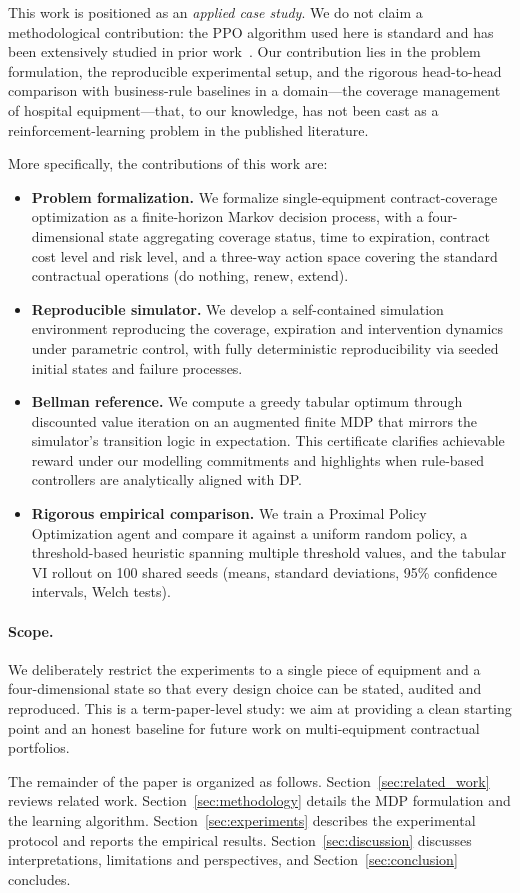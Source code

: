 This work is positioned as an \emph{applied case study}. We do not claim a methodological contribution: the PPO algorithm used here is standard and has been extensively studied in prior work~\cite{schulman2017ppo, andrychowicz2021matters}. Our contribution lies in the problem formulation, the reproducible experimental setup, and the rigorous head-to-head comparison with business-rule baselines in a domain---the coverage management of hospital equipment---that, to our knowledge, has not been cast as a reinforcement-learning problem in the published literature.

More specifically, the contributions of this work are:
\begin{itemize}
    \item \textbf{Problem formalization.} We formalize single-equipment contract-coverage optimization as a finite-horizon Markov decision process, with a four-dimensional state aggregating coverage status, time to expiration, contract cost level and risk level, and a three-way action space covering the standard contractual operations (do nothing, renew, extend).
    \item \textbf{Reproducible simulator.} We develop a self-contained simulation environment reproducing the coverage, expiration and intervention dynamics under parametric control, with fully deterministic reproducibility via seeded initial states and failure processes.
    \item \textbf{Bellman reference.} We compute a greedy tabular optimum through discounted value iteration on an augmented finite MDP that mirrors the simulator's transition logic in expectation. This certificate clarifies achievable reward under our modelling commitments and highlights when rule-based controllers are analytically aligned with DP.
    \item \textbf{Rigorous empirical comparison.} We train a Proximal Policy Optimization agent and compare it against a uniform random policy, a threshold-based heuristic spanning multiple threshold values, and the tabular VI rollout on 100 shared seeds (means, standard deviations, 95\% confidence intervals, Welch tests).
\end{itemize}

\paragraph{Scope.} We deliberately restrict the experiments to a single piece of equipment and a four-dimensional state so that every design choice can be stated, audited and reproduced. This is a term-paper-level study: we aim at providing a clean starting point and an honest baseline for future work on multi-equipment contractual portfolios.

The remainder of the paper is organized as follows. Section~\ref{sec:related_work} reviews related work. Section~\ref{sec:methodology} details the MDP formulation and the learning algorithm. Section~\ref{sec:experiments} describes the experimental protocol and reports the empirical results. Section~\ref{sec:discussion} discusses interpretations, limitations and perspectives, and Section~\ref{sec:conclusion} concludes.